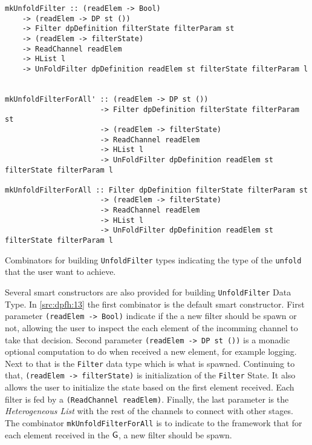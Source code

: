 \begin{listing}[htp!]
  \begin{verbatim}
mkUnfoldFilter :: (readElem -> Bool) 
    -> (readElem -> DP st ()) 
    -> Filter dpDefinition filterState filterParam st 
    -> (readElem -> filterState)
    -> ReadChannel readElem
    -> HList l 
    -> UnFoldFilter dpDefinition readElem st filterState filterParam l


mkUnfoldFilterForAll' :: (readElem -> DP st ())
                      -> Filter dpDefinition filterState filterParam st
                      -> (readElem -> filterState)
                      -> ReadChannel readElem
                      -> HList l
                      -> UnFoldFilter dpDefinition readElem st filterState filterParam l

mkUnfoldFilterForAll :: Filter dpDefinition filterState filterParam st
                      -> (readElem -> filterState)
                      -> ReadChannel readElem
                      -> HList l
                      -> UnFoldFilter dpDefinition readElem st filterState filterParam l
   \end{verbatim}
  \caption[{[\texttt{Stage.hs}] UnfoldFilter combinators}]{Combinators for building \texttt{UnfoldFilter} types indicating the type of the \texttt{unfold} that the user want to achieve.}
  \label{src:dpfh:13}
\end{listing}

Several smart constructors are also provided for building \texttt{UnfoldFilter} Data Type.
In \autoref{src:dpfh:13} the first combinator is the default smart constructor. First parameter \texttt{(readElem -> Bool)} indicate if the a new filter should 
be spawn or not, allowing the user to inspect the each element of the incomming channel to take that decision. Second parameter \texttt{(readElem -> DP st ())} is a monadic optional computation to do when received a new element, for example logging.
Next to that is the \texttt{Filter} data type which is what is spawned. Continuing to that, \texttt{(readElem -> filterState)} is initialization of the \texttt{Filter} State. 
It also allows the user to initialize the state based on the first element received. 
Each filter is fed by a \texttt{(ReadChannel readElem)}. Finally, the last parameter is the \emph{Heterogeneous List} with the rest of the channels to connect with other stages.
The combinator \texttt{mkUnfoldFilterForAll} is to indicate to the framework that for each element received in the $\mathsf{G}$, a new filter should be spawn.


